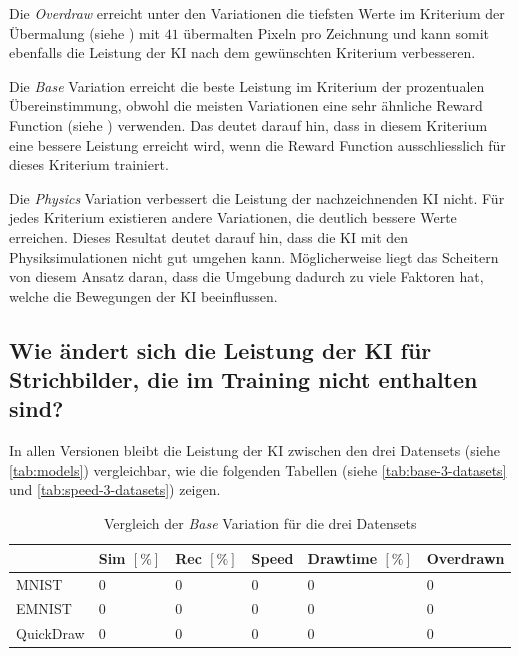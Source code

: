 Die \emph{Overdraw} erreicht unter den Variationen die tiefsten Werte im
Kriterium der Übermalung (siehe ) mit $41$
übermalten Pixeln pro Zeichnung und kann somit ebenfalls die Leistung der KI
nach dem gewünschten Kriterium verbesseren.

Die \emph{Base} Variation erreicht die beste Leistung im Kriterium der
prozentualen Übereinstimmung, obwohl die meisten Variationen eine sehr ähnliche
Reward Function (siehe ) verwenden. Das deutet darauf
hin, dass in diesem Kriterium eine bessere Leistung erreicht wird, wenn die
Reward Function ausschliesslich für dieses Kriterium trainiert.

Die \emph{Physics} Variation verbessert die Leistung der nachzeichnenden KI
nicht. Für jedes Kriterium existieren andere Variationen, die deutlich bessere
Werte erreichen. Dieses Resultat deutet darauf hin, dass die KI mit den
Physiksimulationen nicht gut umgehen kann. Möglicherweise liegt das Scheitern
von diesem Ansatz daran, dass die Umgebung dadurch zu viele Faktoren hat, welche die
Bewegungen der KI beeinflussen.


\subsection{Wie ändert sich die Leistung der KI für Strichbilder, die im Training nicht enthalten sind?}\label{subsub:d_frage_unter_4} 
In allen Versionen bleibt die Leistung der KI zwischen den drei Datensets (siehe
\autoref{tab:models}) vergleichbar, wie die folgenden Tabellen (siehe
\autoref{tab:base-3-datasets} und \autoref{tab:speed-3-datasets}) zeigen.



\begin{table}[!ht]
    \centering
    \caption{Vergleich der \emph{Base} Variation für die drei Datensets}\label{tab:speed-3-dataset}
    \begin{tabular}{|l|l|l|l|l|l|}
            \hline
            \hline ~ & Sim $[\%]$ & Rec $[\%]$ & Speed & Drawtime $[\%]$ & Overdrawn \\ \hline
            MNIST & 0 & 0 & 0 & 0 & 0 \\ \hline
            EMNIST & 0 & 0 & 0 & 0 & 0 \\ \hline
            QuickDraw & 0 & 0 & 0 & 0 & 0 \\ \hline
        \end{tabular}
\end{table}

